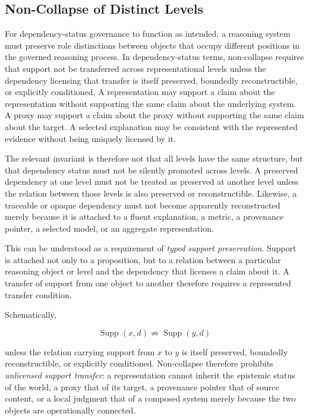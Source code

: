 \documentclass[11pt]{article}
\theoremstyle{definition}
\theoremstyle{remark}
\begin{document}
\subsection{Non-Collapse of Distinct Levels}

For dependency-status governance to function as intended, a reasoning system must preserve role distinctions between objects that occupy different positions in the governed reasoning process. In dependency-status terms, non-collapse requires that support not be transferred across representational levels unless the dependency licensing that transfer is itself preserved, boundedly reconstructible, or explicitly conditioned. A representation may support a claim about the representation without supporting the same claim about the underlying system. A proxy may support a claim about the proxy without supporting the same claim about the target. A selected explanation may be consistent with the represented evidence without being uniquely licensed by it.

The relevant invariant is therefore not that all levels have the same structure, but that dependency status must not be silently promoted across levels. A preserved dependency at one level must not be treated as preserved at another level unless the relation between those levels is also preserved or reconstructible. Likewise, a traceable or opaque dependency must not become apparently reconstructed merely because it is attached to a fluent explanation, a metric, a provenance pointer, a selected model, or an aggregate representation.

This can be understood as a requirement of \emph{typed support preservation}. Support is attached not only to a proposition, but to a relation between a particular reasoning object or level and the dependency that licenses a claim about it. A transfer of support from one object to another therefore requires a represented transfer condition.

Schematically,

\[
\operatorname{Supp}(x,d)
\not\Rightarrow
\operatorname{Supp}(y,d)
\]

unless the relation carrying support from \(x\) to \(y\) is itself preserved, boundedly reconstructible, or explicitly conditioned. Non-collapse therefore prohibits \emph{unlicensed support transfer}: a representation cannot inherit the epistemic status of the world, a proxy that of its target, a provenance pointer that of source content, or a local judgment that of a composed system merely because the two objects are operationally connected.
\end{document}
